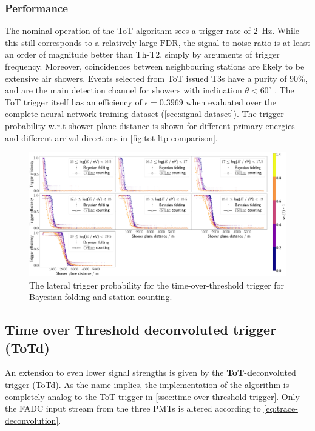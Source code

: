 \subsubsection{Performance}
\label{ssec:tot-performance}

The nominal operation of the ToT algorithm sees a trigger rate of \SI{2}{\hertz}. While this still corresponds to a relatively large $\text{FDR}$, the signal to 
noise ratio is at least an order of magnitude better than Th-T2, simply by arguments of trigger frequency. Moreover, coincidences between neighbouring stations are
likely to be extensive air showers. Events selected from ToT issued T3s have a purity of 90\%, and are the main detection channel for showers with inclination 
$\theta < 60^\circ$ \cite{abraham2010trigger}. The ToT trigger itself has an efficiency of $\epsilon = 0.3969$ when evaluated over the complete neural network 
training dataset (\autoref{sec:signal-dataset}). The trigger probability w.r.t shower plane distance is shown for different primary energies and different arrival 
directions in \autoref{fig:tot-ltp-comparison}.

\begin{figure}
	\centering
	\includegraphics[width=\textwidth]{./plots/tot_LTP_comparison.png}
	\caption{The lateral trigger probability for the time-over-threshold trigger for Bayesian folding and \Offline station counting.} 
	\label{fig:tot-ltp-comparison}
\end{figure}

\subsection{Time over Threshold deconvoluted trigger (ToTd)}
\label{ssec:time-over-threshold-deconvoluted}

An extension to even lower signal strengths is given by the \textbf{ToT}-\textbf{d}econvoluted trigger (ToTd). As the name implies, the implementation of the 
algorithm is completely analog to the ToT trigger in \autoref{ssec:time-over-threshold-trigger}. Only the FADC input stream from the three PMTs is altered 
according to \autoref{eq:trace-deconvolution}.


